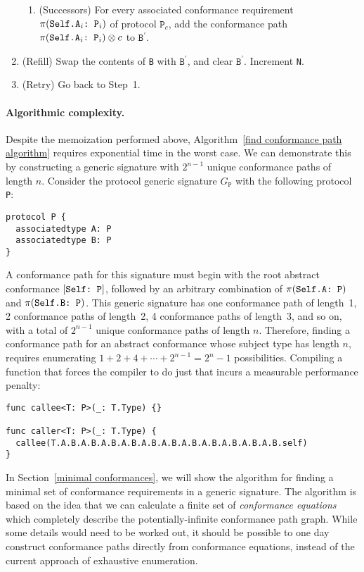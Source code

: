 \documentclass[../generics]{subfiles}
\begin{document}
\begin{algorithm}
\begin{enumerate}
\begin{enumerate}
\item (Successors) For every associated conformance requirement $\pi(\texttt{Self.$\texttt{A}_i$:~$\texttt{P}_i$})$ of protocol $\texttt{P}_c$, add the conformance path $\pi(\texttt{Self.$\texttt{A}_i$:~$\texttt{P}_i$})\otimes c$ to $\texttt{B}^\prime$.
\end{enumerate}

\item (Refill) Swap the contents of \texttt{B} with $\texttt{B}^\prime$, and clear $\texttt{B}^\prime$. Increment \texttt{N}.

\item (Retry) Go back to Step~1.
\end{enumerate}
\end{algorithm}

\paragraph{Algorithmic complexity.}
Despite the memoization performed above, Algorithm~\ref{find conformance path algorithm} requires exponential time in the worst case. We can demonstrate this by constructing a generic signature with $2^{n-1}$ unique conformance paths of length $n$. Consider the protocol generic signature $G_\texttt{P}$ with the following protocol \texttt{P}:
\begin{Verbatim}
protocol P {
  associatedtype A: P
  associatedtype B: P
}
\end{Verbatim}

A conformance path for this signature must begin with the root abstract conformance $[\texttt{Self:~P}]$, followed by an arbitrary combination of $\pi(\texttt{Self.A:~P})$ and $\pi(\texttt{Self.B:~P})$. This generic signature has one conformance path of length~1, 2 conformance paths of length~2, 4 conformance paths of length~3, and so on, with a total of $2^{n-1}$ unique conformance paths of length $n$. Therefore, finding a conformance path for an abstract conformance whose subject type has length $n$, requires enumerating $1+2+4+\cdots+2^{n-1}=2^n-1$ possibilities. Compiling a function that forces the compiler to do just that incurs a measurable performance penalty:
\begin{Verbatim}
func callee<T: P>(_: T.Type) {}

func caller<T: P>(_: T.Type) {
  callee(T.A.B.A.B.A.B.A.B.A.B.A.B.A.B.A.B.A.B.A.B.A.B.self)
}
\end{Verbatim}

In Section~\ref{minimal conformances}, we will show the algorithm for finding a minimal set of conformance requirements in a generic signature. The algorithm is based on the idea that we can calculate a finite set of \emph{conformance equations} which completely describe the potentially-infinite conformance path graph. While some details would need to be worked out, it should be possible to one day construct conformance paths directly from conformance equations, instead of the current approach of exhaustive enumeration.
\end{document}
